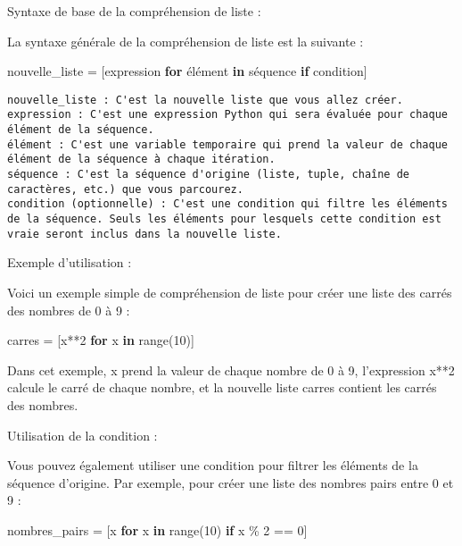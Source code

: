 \documentclass[11pt]{article}
\newenvironment{Shaded}{}{}
\newcommand{\KeywordTok}[1]{\textcolor[rgb]{0.00,0.44,0.13}{\textbf{{#1}}}}
\newcommand{\DecValTok}[1]{\textcolor[rgb]{0.25,0.63,0.44}{{#1}}}
\newcommand{\NormalTok}[1]{{#1}}
\newcommand{\ControlFlowTok}[1]{\textcolor[rgb]{0.00,0.44,0.13}{\textbf{{#1}}}}
\newcommand{\OperatorTok}[1]{\textcolor[rgb]{0.40,0.40,0.40}{{#1}}}
\newcommand{\BuiltInTok}[1]{{#1}}
\begin{document}
Syntaxe de base de la compréhension de liste :

La syntaxe générale de la compréhension de liste est la suivante :

\begin{Shaded}
\begin{Highlighting}[]
\NormalTok{nouvelle\_liste }\OperatorTok{=}\NormalTok{ [expression }\ControlFlowTok{for}\NormalTok{ élément }\KeywordTok{in}\NormalTok{ séquence }\ControlFlowTok{if}\NormalTok{ condition]}
\end{Highlighting}
\end{Shaded}

\begin{verbatim}
nouvelle_liste : C'est la nouvelle liste que vous allez créer.
expression : C'est une expression Python qui sera évaluée pour chaque élément de la séquence.
élément : C'est une variable temporaire qui prend la valeur de chaque élément de la séquence à chaque itération.
séquence : C'est la séquence d'origine (liste, tuple, chaîne de caractères, etc.) que vous parcourez.
condition (optionnelle) : C'est une condition qui filtre les éléments de la séquence. Seuls les éléments pour lesquels cette condition est vraie seront inclus dans la nouvelle liste.
\end{verbatim}

Exemple d'utilisation :

Voici un exemple simple de compréhension de liste pour créer une liste
des carrés des nombres de 0 à 9 :

\begin{Shaded}
\begin{Highlighting}[]
\NormalTok{carres }\OperatorTok{=}\NormalTok{ [x}\OperatorTok{**}\DecValTok{2} \ControlFlowTok{for}\NormalTok{ x }\KeywordTok{in} \BuiltInTok{range}\NormalTok{(}\DecValTok{10}\NormalTok{)]}
\end{Highlighting}
\end{Shaded}

Dans cet exemple, x prend la valeur de chaque nombre de 0 à 9,
l'expression x**2 calcule le carré de chaque nombre, et la nouvelle
liste carres contient les carrés des nombres.

Utilisation de la condition :

Vous pouvez également utiliser une condition pour filtrer les éléments
de la séquence d'origine. Par exemple, pour créer une liste des nombres
pairs entre 0 et 9 :

\begin{Shaded}
\begin{Highlighting}[]
\NormalTok{nombres\_pairs }\OperatorTok{=}\NormalTok{ [x }\ControlFlowTok{for}\NormalTok{ x }\KeywordTok{in} \BuiltInTok{range}\NormalTok{(}\DecValTok{10}\NormalTok{) }\ControlFlowTok{if}\NormalTok{ x }\OperatorTok{\%} \DecValTok{2} \OperatorTok{==} \DecValTok{0}\NormalTok{]}
\end{Highlighting}
\end{Shaded}
\end{document}
